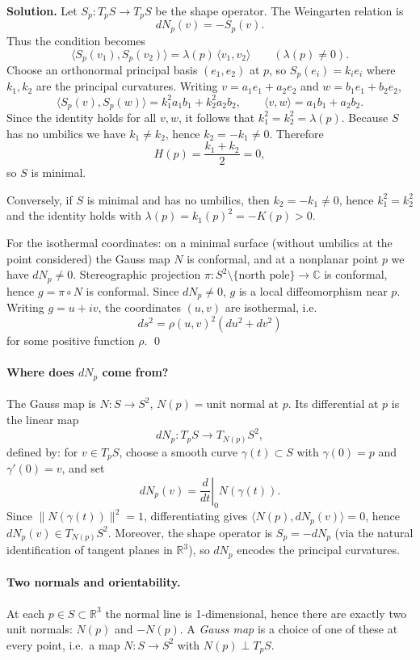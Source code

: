 \documentclass[12pt,a4paper]{article}
\theoremstyle{plain}
\theoremstyle{definition}      %
\begin{document}
	\medskip
	\textbf{Solution.}
	Let $S_p:T_pS\to T_pS$ be the shape operator. The Weingarten relation is
	\[
	dN_p(v)=-S_p(v).
	\]
	Thus the condition becomes
	\[
	\langle S_p(v_1), S_p(v_2)\rangle = \lambda(p)\,\langle v_1,v_2\rangle
	\qquad(\lambda(p)\neq 0).
	\]
	Choose an orthonormal principal basis $(e_1,e_2)$ at $p$, so $S_p(e_i)=k_i e_i$ where $k_1,k_2$ are the
	principal curvatures. Writing $v=a_1e_1+a_2e_2$ and $w=b_1e_1+b_2e_2$,
	\[
	\langle S_p(v),S_p(w)\rangle = k_1^2 a_1b_1 + k_2^2 a_2b_2,\qquad
	\langle v,w\rangle = a_1b_1+a_2b_2.
	\]
	Since the identity holds for all $v,w$, it follows that $k_1^2=k_2^2=\lambda(p)$.
	Because $S$ has no umbilics we have $k_1\neq k_2$, hence $k_2=-k_1\neq 0$.
	Therefore
	\[
	H(p)=\frac{k_1+k_2}{2}=0,
	\]
	so $S$ is minimal.
	
	Conversely, if $S$ is minimal and has no umbilics, then $k_2=-k_1\neq 0$, hence $k_1^2=k_2^2$ and the
	identity holds with $\lambda(p)=k_1(p)^2=-K(p)>0$.
	
	\medskip
	For the isothermal coordinates: on a minimal surface (without umbilics at the point considered) the Gauss map
	$N$ is conformal, and at a nonplanar point $p$ we have $dN_p\neq 0$.
	Stereographic projection $\pi:S^2\setminus\{\text{north pole}\}\to\mathbb C$ is conformal, hence
	$g=\pi\circ N$ is conformal. Since $dN_p\neq 0$, $g$ is a local diffeomorphism near $p$.
	Writing $g=u+iv$, the coordinates $(u,v)$ are isothermal, i.e.
	\[
	ds^2 = \rho(u,v)^2(du^2+dv^2)
	\]
	for some positive function $\rho$.
	\qed
	
	
	\paragraph{Where does $dN_p$ come from?}
	The Gauss map is $N:S\to S^2$, $N(p)=\text{unit normal at }p$.
	Its differential at $p$ is the linear map
	\[
	dN_p:T_pS\to T_{N(p)}S^2,
	\]
	defined by: for $v\in T_pS$, choose a smooth curve $\gamma(t)\subset S$ with
	$\gamma(0)=p$ and $\gamma'(0)=v$, and set
	\[
	dN_p(v)=\left.\frac{d}{dt}\right|_{0}N(\gamma(t)).
	\]
	Since $\|N(\gamma(t))\|^2=1$, differentiating gives
	$\langle N(p),dN_p(v)\rangle=0$, hence $dN_p(v)\in T_{N(p)}S^2$.
	Moreover, the shape operator is $S_p=-dN_p$ (via the natural identification of tangent planes in $\mathbb{R}^3$),
	so $dN_p$ encodes the principal curvatures.
	
	\paragraph{Two normals and orientability.}
	At each $p\in S\subset\mathbb{R}^3$ the normal line is 1-dimensional, hence there are exactly two unit normals:
	$N(p)$ and $-N(p)$. A \emph{Gauss map} is a choice of one of these at every point,
	i.e.\ a map $N:S\to S^2$ with $N(p)\perp T_pS$.
	
\end{document}
